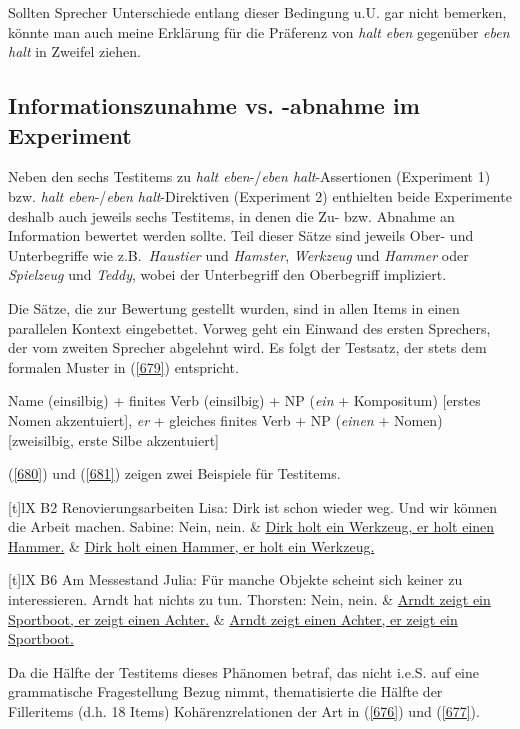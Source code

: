 Sollten Sprecher Unterschiede entlang dieser Bedingung u.U. gar nicht bemerken, könnte man auch meine Erklärung für die Präferenz von \textit{halt eben} gegenüber \textit{eben halt} in Zweifel ziehen.
		
\subsection{Informationszunahme vs. -abnahme im Experiment}
Neben den sechs Testitems zu \textit{halt eben}-/\textit{eben halt}-Assertionen (Experiment 1) bzw. \textit{halt eben}-/\textit{eben halt}-Direktiven (Experiment 2) enthielten beide Experimente deshalb auch jeweils sechs Testitems, in denen die Zu- bzw. Abnahme  an Information bewertet werden sollte. Teil dieser Sätze sind jeweils Ober- und Unterbegriffe wie z.B.\ \textit{Haustier} und \textit{Hamster}, \textit{Werkzeug} und \textit{Hammer} oder \textit{Spielzeug} und \textit{Teddy}, wobei der Unterbegriff den Oberbegriff impliziert. 
	
Die Sätze, die zur Bewertung gestellt wurden, sind in allen Items in einen pa\-rallelen Kontext eingebettet. Vorweg geht ein Einwand des ersten Sprechers, der vom zweiten Sprecher abgelehnt wird. Es folgt der Testsatz, der stets dem formalen Muster in (\ref{679}) entspricht.

\begin{exe}
	\ex\label{679} 
	Name (einsilbig) + finites Verb (einsilbig) + NP (\textit{ein} + Kompositum) [erstes Nomen akzentuiert], \textit{er} + gleiches finites Verb + NP (\textit{einen} + Nomen) [zweisilbig, erste Silbe akzentuiert]
\end{exe}
(\ref{680}) und (\ref{681}) zeigen zwei Beispiele für Testitems.

\begin{exe}
	\ex\label{680}
	\begin{tabularx}{\linewidth}[t]{lX}
	 {B2 Renovierungsarbeiten} \tabularnewline
	 {Lisa: Dirk ist schon wieder weg. Und wir können die Arbeit machen.} \tabularnewline
	Sabine: Nein, nein. & \ul{Dirk holt ein Werkzeug, er holt einen Hammer.} \tabularnewline
	{} & \ul{Dirk holt einen Hammer, er holt ein Werkzeug.}
    \end{tabularx}
\end{exe}

\begin{exe}
	\ex\label{681}
	\begin{tabularx}{\linewidth}[t]{lX}
	 {B6 Am Messestand} \tabularnewline
	 {Julia: Für manche Objekte scheint sich keiner zu interessieren. Arndt} 					
	\tabularnewline
	 {hat nichts zu tun.} 					
	\tabularnewline
	Thorsten: Nein, nein. & \ul{Arndt zeigt ein Sportboot, er zeigt einen Achter.} \tabularnewline
	{} & \ul{Arndt zeigt einen Achter, er zeigt ein Sportboot.}
    \end{tabularx}
\end{exe}
Da die Hälfte der Testitems dieses Phänomen betraf, das nicht i.e.S. auf eine grammatische Fragestellung Bezug nimmt, thematisierte die Hälfte der Filleritems (d.h. 18 Items) Kohärenzrelationen  der Art in (\ref{676}) und (\ref{677}).

